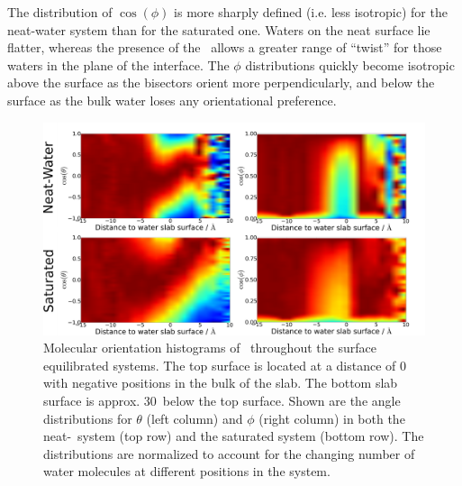 The distribution of $\cos(\phi)$ is more sharply defined (i.e. less isotropic) for the neat-water system than for the saturated one. Waters on the neat surface lie flatter, whereas the presence of the \suldiox~allows a greater range of ``twist'' for those waters in the plane of the interface. The $\phi$ distributions quickly become isotropic above the surface as the bisectors orient more perpendicularly, and below the surface as the bulk water loses any orientational preference.


\begin{figure}[h!]
	\begin{center}
		\includegraphics[scale=1.0]{images/h2o-angles/h2oangles.png}
		\caption{Molecular orientation histograms of \wat~throughout the surface equilibrated systems. The top surface is located at a distance of 0 with negative positions in the bulk of the slab. The bottom slab surface is approx. 30\angs~below the top surface. Shown are the angle distributions for $\theta$ (left column) and $\phi$ (right column) in both the neat-\wat~system (top row) and the saturated system (bottom row). The distributions are normalized to account for the changing number of water molecules at different positions in the system.}
		\label{fig:water-orientation}
	\end{center}
\end{figure}


